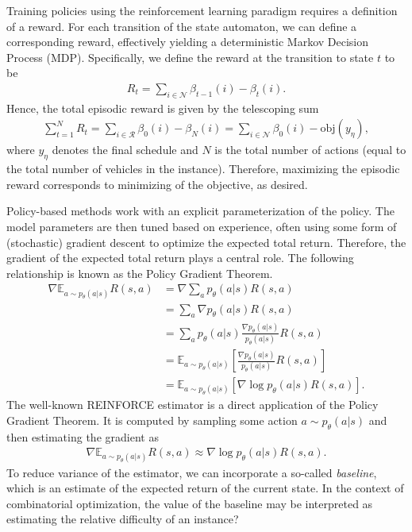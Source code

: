 \documentclass[a4paper]{article}
\theoremstyle{definition}
\theoremstyle{plain}
\begin{document}
Training policies using the reinforcement learning paradigm requires a
definition of a reward.
%
For each transition of the state automaton, we can define a corresponding
reward, effectively yielding a deterministic Markov Decision Process (MDP).
Specifically, we define the reward at the transition to state $t$ to be
\begin{align*}
  R_{t} = \sum_{i \in \mathcal{N}} \beta_{t-1}(i) - \beta_{t}(i) .
\end{align*}
Hence, the total episodic reward is given by the telescoping sum
\begin{align*}
  \sum_{t=1}^{N} R_{t} = \sum_{i \in \mathcal{R}} \beta_{0}(i) - \beta_{N}(i)  = \sum_{i \in \mathcal{N}} \beta_{0}(i) - \textrm{obj}(y_{\eta}) ,
\end{align*}
where $y_{\eta}$ denotes the final schedule and $N$ is the total number of
actions (equal to the total number of vehicles in the instance). Therefore,
maximizing the episodic reward corresponds to minimizing of the objective, as
desired.


Policy-based methods work with an explicit parameterization of the policy. The
model parameters are then tuned based on experience, often using some form of
(stochastic) gradient descent to optimize the expected total return.
%
Therefore, the gradient of the expected total return plays a central role. The following relationship is known as the Policy Gradient Theorem.
\begin{align*}
  \nabla \mathbb{E}_{a \sim p_{\theta}(a | s)} R(s, a) &= \nabla \sum_{a} p_{\theta}(a | s) R(s, a) \\
  &= \sum_{a} \nabla p_{\theta}(a | s) R(s, a) \\
  &= \sum_{a} p_{\theta}(a | s) \frac{\nabla p_{\theta}(a | s)}{p_{\theta}(a | s)} R(s, a) \\
  &= \mathbb{E}_{a \sim p_{\theta}(a | s)} \left[  \frac{\nabla p_{\theta}(a | s)}{p_{\theta}(a | s)} R(s, a) \right] \\
  &= \mathbb{E}_{a \sim p_{\theta}(a | s)} [ \nabla \log p_{\theta}(a | s) R(s, a) ] .
\end{align*}
%
The well-known REINFORCE estimator is a direct application of the Policy
Gradient Theorem. It is computed by sampling some action
$a \sim p_{\theta}(a | s)$ and then estimating the gradient as
\begin{align*}
  \nabla \mathbb{E}_{a \sim p_{\theta}(a | s)} R(s, a) \approx \nabla \log p_{\theta}(a | s) R(s, a) .
\end{align*}
%
To reduce variance of the estimator, we can incorporate a so-called
\textit{baseline}, which is an estimate of the expected return of the current
state.
%
In the context of combinatorial optimization, the value of the baseline may be
interpreted as estimating the relative difficulty of an instance?
\end{document}
